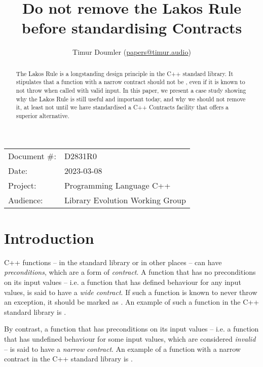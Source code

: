 


\title{Do not remove the Lakos Rule before standardising Contracts}
\author{ Timur Doumler \small(\href{mailto:papers@timur.audio}{papers@timur.audio})  }
\date{}
\maketitle

\begin{tabular}{ll}
Document \#: & D2831R0 \\
Date: &2023-03-08 \\
Project: & Programming Language C++ \\
Audience: & Library Evolution Working Group
\end{tabular}

\begin{abstract}
The Lakos Rule is a longstanding design principle in the C++ standard library. It stipulates that a function with a narrow contract should not be  , even if it is known to not throw when called with valid input. In this paper, we present a case study showing why the Lakos Rule is still useful and important today, and why we should not remove it, at least not until we have standardised a C++ Contracts facility that offers a superior alternative.
\end{abstract}

\section{Introduction}
\label{sec:intro}

C++ functions -- in the standard library or in other places -- can have \emph{preconditions}, which are a form of \emph{contract}. A function that has no preconditions on its input values -- i.e. a function that has defined behaviour for any input values, is said to have a \emph{wide contract}.  If such a function is known to never throw an exception, it should be marked as . An example of such a function in the C++ standard library is .

By contrast, a function that has preconditions on its input values -- i.e. a function that has undefined behaviour for some input values, which are considered \emph{invalid} -- is said to have a \emph{narrow contract}. An example of a function with a narrow contract in the C++ standard library is .

